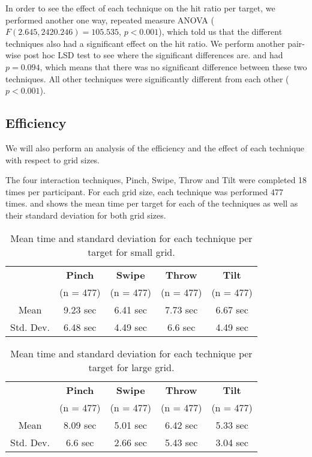 In order to see the effect of each technique on the hit ratio per target, we performed another one way, repeated measure ANOVA ($F(2.645,2420.246)=105.535$, $p<0.001$), which told us that the different techniques also had a significant effect on the hit ratio. We perform another pair-wise post hoc LSD test to see where the significant differences are. \pinch and \tilt had $p=0.094$, which means that there was no significant difference between these two techniques. All other techniques were significantly different from each other ($p<0.001$). 

\subsection{Efficiency}
We will also perform an analysis of the efficiency and the effect of each technique with respect to grid sizes.

The four interaction techniques, Pinch, Swipe, Throw and Tilt were completed 18 times per participant. For each grid size, each technique was performed 477 times.  and  shows the mean time per target for each of the techniques as well as their standard deviation for both grid sizes. 
\begin{table}[H]
	\centering
	\begin{tabular}{|c|c|c|c|c|}
		\hline
		\rowcolor[HTML]{9B9B9B} 
		 & \textbf{Pinch} & \textbf{Swipe} & \textbf{Throw} & \textbf{Tilt} \\ 
		 \rowcolor[HTML]{9B9B9B} 
		 & (n = 477) & (n = 477) & (n = 477) & (n = 477) \\ \hline
		Mean & 9.23  sec         & 6.41 sec          & 7.73 sec          & 6.67 sec         \\ \hline
		Std. Dev. & 6.48 sec & 4.49 sec & 6.6 sec & 4.49 sec \\ \hline
	\end{tabular}
	\caption{Mean time and standard deviation for each technique per target for small grid.}
	\label{tab:meanTimesTechniqueSmall}
\end{table}

\begin{table}[H]
	\centering
	\begin{tabular}{|c|c|c|c|c|}
		\hline
		\rowcolor[HTML]{9B9B9B} 
		 & \textbf{Pinch} & \textbf{Swipe} & \textbf{Throw} & \textbf{Tilt} \\
		 \rowcolor[HTML]{9B9B9B}
		 & (n = 477) & (n = 477) & (n = 477) & (n = 477) \\ \hline
		Mean & 8.09  sec         & 5.01 sec          & 6.42 sec          & 5.33 sec         \\ \hline
		Std. Dev. & 6.6 sec & 2.66 sec & 5.43 sec & 3.04 sec \\ \hline
	\end{tabular}
	\caption{Mean time and standard deviation for each technique per target for large grid.}
	\label{tab:meanTimesTechniqueLarge}
\end{table}

